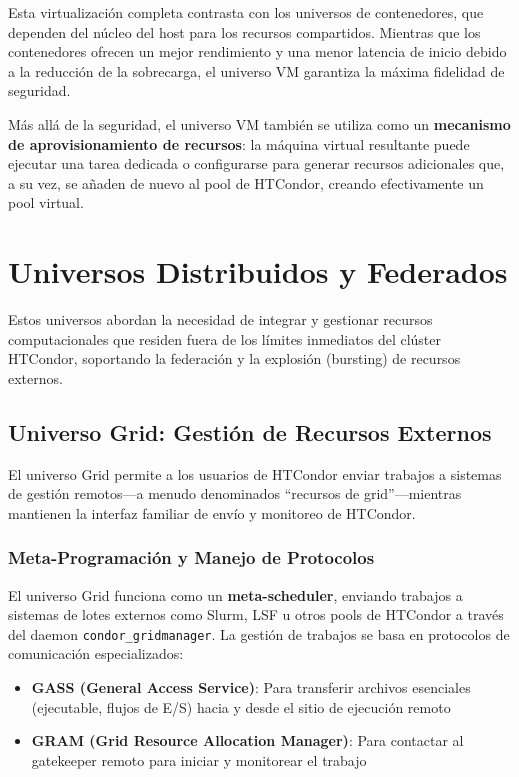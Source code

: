 Esta virtualización completa contrasta con los universos de contenedores, que dependen del núcleo del host para los recursos compartidos. Mientras que los contenedores ofrecen un mejor rendimiento y una menor latencia de inicio debido a la reducción de la sobrecarga, el universo VM garantiza la máxima fidelidad de seguridad.

Más allá de la seguridad, el universo VM también se utiliza como un \textbf{mecanismo de aprovisionamiento de recursos}: la máquina virtual resultante puede ejecutar una tarea dedicada o configurarse para generar recursos adicionales que, a su vez, se añaden de nuevo al pool de HTCondor, creando efectivamente un pool virtual.

\section{Universos Distribuidos y Federados}

Estos universos abordan la necesidad de integrar y gestionar recursos computacionales que residen fuera de los límites inmediatos del clúster HTCondor, soportando la federación y la explosión (bursting) de recursos externos.

\subsection{Universo Grid: Gestión de Recursos Externos}

El universo Grid permite a los usuarios de HTCondor enviar trabajos a sistemas de gestión remotos---a menudo denominados ``recursos de grid''---mientras mantienen la interfaz familiar de envío y monitoreo de HTCondor.

\subsubsection{Meta-Programación y Manejo de Protocolos}

El universo Grid funciona como un \textbf{meta-scheduler}, enviando trabajos a sistemas de lotes externos como Slurm, LSF u otros pools de HTCondor a través del daemon \texttt{condor\_gridmanager}. La gestión de trabajos se basa en protocolos de comunicación especializados:

\begin{itemize}
	\item \textbf{GASS (General Access Service)}: Para transferir archivos esenciales (ejecutable, flujos de E/S) hacia y desde el sitio de ejecución remoto

	\item \textbf{GRAM (Grid Resource Allocation Manager)}: Para contactar al gatekeeper remoto para iniciar y monitorear el trabajo
\end{itemize}


